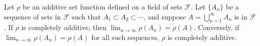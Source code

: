 Let $\rho$ be an additive set function defined on a field of sets $\mathcal{F}$. Let $\{A_n\}$ be a sequence of sets in $\mathcal{F}$ such that $A_1 \subset A_2 \subset \cdots$, and suppose $A = \bigcup_{n=1}^{\infty} A_n$ is in $\mathcal{F}$. If $\rho$ is completely additive, then $\lim_{n \to \infty} \rho(A_n) = \rho(A)$. Conversely, if $\lim_{n \to \infty} \rho(A_n) = \rho(A)$ for all such sequences, $\rho$ is completely additive.
